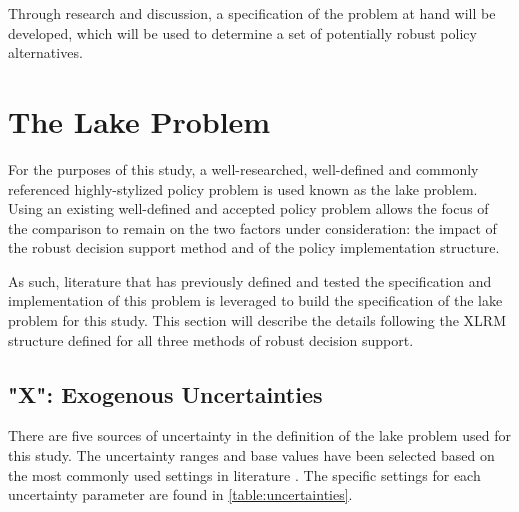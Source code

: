 Through research and discussion, a specification of the problem at hand will be developed, which will be used to determine a set of potentially robust policy alternatives. 

\section{The Lake Problem}
For the purposes of this study, a well-researched, well-defined and commonly referenced highly-stylized policy problem is used known as the lake problem. Using an existing well-defined and accepted policy problem allows the focus of the comparison to remain on the two factors under consideration: the impact of the robust decision support method and of the policy implementation structure. 

As such, literature that has previously defined and tested the specification and implementation of this problem is leveraged to build the specification of the lake problem for this study. This section will describe the details following the XLRM structure defined for all three methods of robust decision support. 

    \subsection{"X": Exogenous Uncertainties}\label{step1-X}
    There are five sources of uncertainty in the definition of the lake problem used for this study. The uncertainty ranges and base values have been selected based on the most commonly used settings in literature \citep{Carpenter1999,Eker2018,Hadka2015,Quinn2017,Ward2015}. The specific settings for each uncertainty parameter are found in \cref{table:uncertainties}. 

